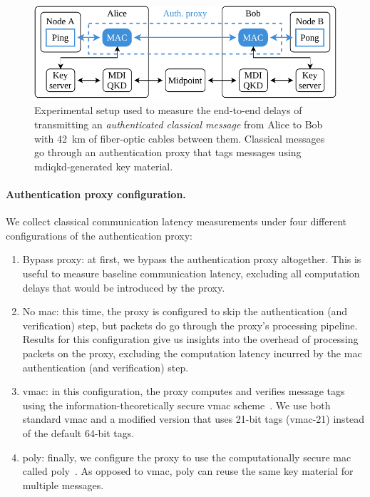 \begin{figure}[t]
    \centering
    \includegraphics[width=0.6\linewidth]{figures/mac-setup-diagram.pdf}
    \caption{
        Experimental setup used to measure the end-to-end delays of transmitting an
        \emph{authenticated classical message} from Alice to Bob with \qty{42}{\km} of fiber-optic
        cables between them. Classical messages go through an authentication proxy that tags
        messages using \acrshort{mdiqkd}-generated key material.
    }
    \label{fig:mac-setup-diagram}
\end{figure}

\paragraph*{Authentication proxy configuration.}

We collect classical communication latency measurements under four different configurations of the
authentication proxy:

\begin{enumerate}
    \item Bypass proxy: at first, we bypass the authentication proxy altogether. This is useful to
          measure baseline communication latency, excluding all computation delays that would be
          introduced by the proxy.
    \item No \acrshort{mac}: this time, the proxy is configured to skip the authentication (and
          verification) step, but packets do go through the proxy's processing pipeline. Results for
          this configuration give us insights into the overhead of processing packets on the proxy,
          excluding the computation latency incurred by the \acrshort{mac} authentication (and
          verification) step.
    \item \acrshort{vmac}: in this configuration, the proxy computes and verifies message tags using
          the information-theoretically secure \acrshort{vmac} scheme~\cite{krovetz_2007_message}.
          We use both standard \acrshort{vmac} and a modified version that uses 21-bit tags
          (\acrshort{vmac}-21) instead of the default 64-bit tags.
    \item \acrshort{poly}: finally, we configure the proxy to use the computationally secure
          \acrshort{mac} called \acrshort{poly}~\cite{bernstein_2005_poly1305}. As opposed to
          \acrshort{vmac}, \acrshort{poly} can reuse the same key material for multiple messages.
\end{enumerate}

